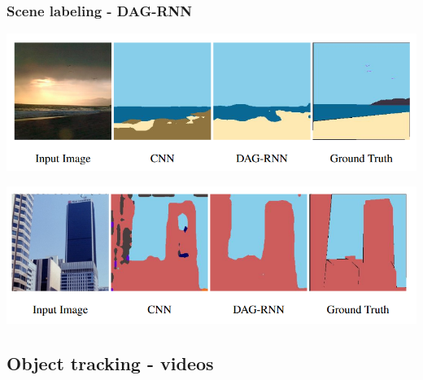 \begin{frame}
	\frametitle{Scene labeling - DAG-RNN}

\begin{center}
	\includegraphics[scale=0.6]{figs/DAG-RNN_results1}
\end{center}

\begin{center}
	\includegraphics[scale=0.6]{figs/DAG-RNN_results2}
\end{center}

\end{frame}



\subsection{Object tracking - videos}

